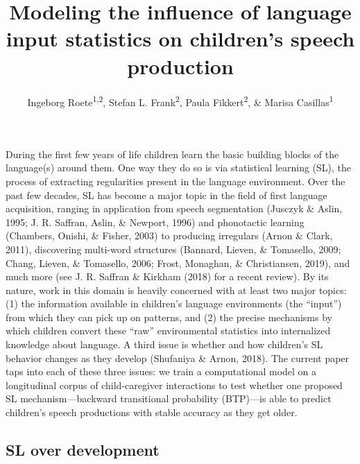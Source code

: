 \documentclass[man,mask,floatsintext]{apa6}
\affiliation{
\vspace{0.5cm}
\textsuperscript{1} Max Planck Institute for Psycholinguistics\\\textsuperscript{2} Radboud University}
\title{Modeling the influence of language input statistics on children's speech
production}
\author{Ingeborg Roete\textsuperscript{1,2}, Stefan L. Frank\textsuperscript{2},
Paula Fikkert\textsuperscript{2}, \& Marisa Casillas\textsuperscript{1}}
\date{}
\theoremstyle{definition}
\theoremstyle{definition}
\theoremstyle{definition}
\theoremstyle{remark}
\begin{document}
\maketitle

During the first few years of life children learn the basic building
blocks of the language(s) around them. One way they do so is via
statistical learning (SL), the process of extracting regularities
present in the language environment. Over the past few decades, SL has
become a major topic in the field of first language acquisition, ranging
in application from speech segmentation (Jusczyk \& Aslin, 1995; J. R.
Saffran, Aslin, \& Newport, 1996) and phonotactic learning (Chambers,
Onishi, \& Fisher, 2003) to producing irregulars (Arnon \& Clark, 2011),
discovering multi-word structures (Bannard, Lieven, \& Tomasello, 2009;
Chang, Lieven, \& Tomasello, 2006; Frost, Monaghan, \& Christiansen,
2019), and much more (see J. R. Saffran \& Kirkham (2018) for a recent
review). By its nature, work in this domain is heavily concerned with at
least two major topics: (1) the information available in children's
language environments (the \enquote{input}) from which they can pick up
on patterns, and (2) the precise mechanisms by which children convert
these \enquote{raw} environmental statistics into internalized knowledge
about language. A third issue is whether and how children's SL behavior
changes as they develop (Shufaniya \& Arnon, 2018). The current paper
taps into each of these three issues: we train a computational model on
a longitudinal corpus of child-caregiver interactions to test whether
one proposed SL mechanism---backward transitional probability (BTP)---is
able to predict children's speech productions with stable accuracy as
they get older.

\subsection{SL over development}\label{sl-over-development}
\end{document}
